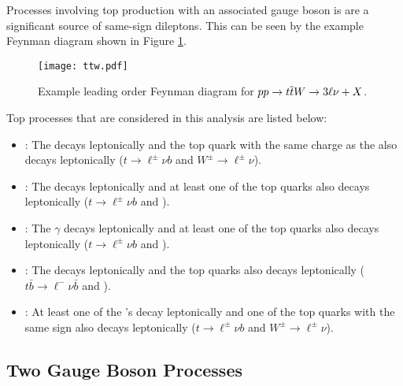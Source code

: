 Processes involving top production with an associated gauge boson is are a
significant source of same-sign dileptons. This can be seen by the example Feynman
diagram shown in Figure \ref{fig:feyn_ttw}.
\begin{figure}[!htb]
\begin{center}
\texttt{[image: ttw.pdf]}
\caption[Feynman diagram for \ttW]
{\label{fig:feyn_ttw}
Example leading order Feynman diagram for $pp \to \relax{t}\overline{\relax{t}}\relax{W} \to 3\ell\nu + X$.
}
\end{center}
\end{figure}
Top processes that are considered in this analysis are listed below:
\begin{itemize}
\item \ttW: The \W decays leptonically and the top quark with the same charge as the \W also decays leptonically ($t \to \ell^{\pm}\nu b$ and $W^{\pm} \to \ell^{\pm}\nu$).
\item \ttZ: The \Z decays leptonically and at least one of the top quarks also decays leptonically ($t \to \ell^{\pm}\nu b$ and \Zlplm).
\item \ttG: The $\gamma$ decays leptonically and at least one of the top quarks also decays leptonically ($t \to \ell^{\pm}\nu b$ and \Glplm).
\item \tbZ: The \Z decays leptonically and the top quarks also decays leptonically ($t\bar{b} \to \ell^-\nu \bar{b}$ and \Zlplm).
\item \ttWW: At least one of the \W's decay leptonically and one of the top quarks with the same sign also decays leptonically ($t \to \ell^{\pm}\nu b$ and $W^{\pm} \to \ell^{\pm}\nu$).
\end{itemize}

\subsection{Two Gauge Boson Processes}
\label{sec:ss_rare_diboson}
 
